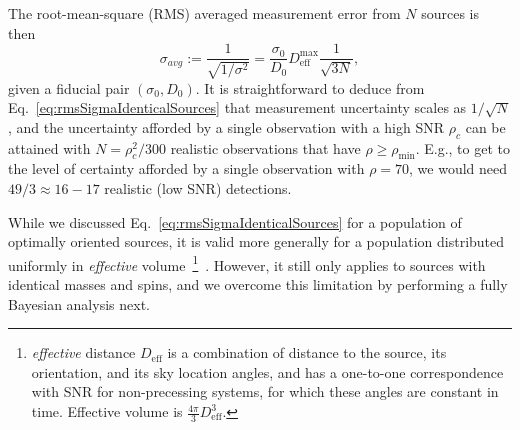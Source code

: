 \documentclass[aps,prd,amsmath,floats,floatfix, twocolumn,
superscriptaddress,nofootinbib,showpacs]{revtex4-1}
\newcommand{\D}{\mathrm{d}}
\newcommand{\deff}{D_\mathrm{eff}}
\begin{document}
The root-mean-square (RMS) averaged measurement error from $N$ sources is 
then~\cite{Markakis:2010mp}
\begin{equation}\label{eq:rmsSigmaIdenticalSources}
 \sigma_{avg} := \frac{1}{\sqrt{1/\sigma^{2}}} = \frac{\sigma_0}{D_0} \deff^\mathrm{max} \frac{1}{\sqrt{3 N}},
\end{equation}
given a fiducial pair $(\sigma_0, D_0)$. It is straightforward to deduce from
Eq.~\ref{eq:rmsSigmaIdenticalSources} that measurement uncertainty scales as 
$1/\sqrt{N}$, and the uncertainty afforded by a single observation with a high
SNR $\rho_c$ can be attained with $N = \rho_c^2/300$ realistic observations
that have $\rho\geq\rho_\mathrm{min}$. E.g., to get to the
level of certainty afforded by a single observation with $\rho=70$, we would
need $49/3\approx 16-17$ realistic (low SNR) detections.

While we discussed Eq.~\ref{eq:rmsSigmaIdenticalSources} for a population
of optimally oriented sources, it is valid more generally for a population
distributed uniformly in {\it effective} volume~\footnote{{\it effective} 
distance $D_\mathrm{eff}$ 
is a combination of distance to the source, its orientation, and its sky
location angles, and has a one-to-one correspondence with SNR for non-precessing
systems, for which these angles are constant in time. Effective volume is 
$\frac{4\pi}{3}D_\mathrm{eff}^3$.}~\cite{Markakis:2010mp}. However, it 
still only applies to sources with identical masses and spins, and we 
overcome this limitation by performing a fully Bayesian analysis next.
\end{document}
